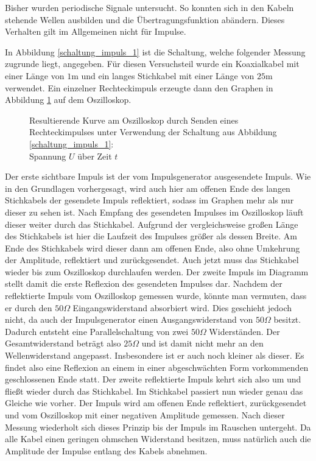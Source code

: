 		Bisher wurden periodische Signale untersucht.
		So konnten sich in den Kabeln stehende Wellen ausbilden und die Übertragungsfunktion abändern.
		Dieses Verhalten gilt im Allgemeinen nicht für Impulse.

		In Abbildung \ref{schaltung_impuls_1} ist die Schaltung, welche folgender Messung zugrunde liegt, angegeben.
		Für diesen Versuchsteil wurde ein Koaxialkabel mit einer Länge von $1$m und ein langes Stichkabel mit einer Länge von $25$m verwendet.
		Ein einzelner Rechteckimpuls erzeugte dann den Graphen in Abbildung \ref{diagramm_impuls_1} auf dem Oszilloskop.

		\begin{figure}[H]
			\center
			
			\caption{\centering Resultierende Kurve am Oszilloskop durch Senden eines Rechteckimpulses unter Verwendung der Schaltung aus Abbildung \ref{schaltung_impuls_1}: \\ Spannung $U$ über Zeit $t$}
			\label{diagramm_impuls_1}
		\end{figure}

		Der erste sichtbare Impuls ist der vom Impulsgenerator ausgesendete Impuls.
		Wie in den Grundlagen vorhergesagt, wird auch hier am offenen Ende des langen Stichkabels der gesendete Impuls reflektiert, sodass im Graphen mehr als nur dieser zu sehen ist.
		Nach Empfang des gesendeten Impulses im Oszilloskop läuft dieser weiter durch das Stichkabel.
		Aufgrund der vergleichsweise großen Länge des Stichkabels ist hier die Laufzeit des Impulses größer als dessen Breite.
		Am Ende des Stichkabels wird dieser dann am offenen Ende, also ohne Umkehrung der Amplitude, reflektiert und zurückgesendet.
		Auch jetzt muss das Stichkabel wieder bis zum Oszilloskop durchlaufen werden.
		Der zweite Impuls im Diagramm stellt damit die erste Reflexion des gesendeten Impulses dar.
		Nachdem der reflektierte Impuls vom Oszilloskop gemessen wurde, könnte man vermuten, dass er durch den $50\Omega$ Eingangswiderstand absorbiert wird.
		Dies geschieht jedoch nicht, da auch der Impulsgenerator einen Ausgangswiderstand von $50\Omega$ besitzt.
		Dadurch entsteht eine Parallelschaltung von zwei $50\Omega$ Widerständen.
		Der Gesamtwiderstand beträgt also $25\Omega$ und ist damit nicht mehr an den Wellenwiderstand angepasst.
		Insbesondere ist er auch noch kleiner als dieser.
		Es findet also eine Reflexion an einem in einer abgeschwächten Form vorkommenden geschlossenen Ende statt.
		Der zweite reflektierte Impuls kehrt sich also um und fließt wieder durch das Stichkabel.
		Im Stichkabel passiert nun wieder genau das Gleiche wie vorher.
		Der Impuls wird am offenen Ende reflektiert, zurückgesendet und vom Oszilloskop mit einer negativen Amplitude gemessen.
		Nach dieser Messung wiederholt sich dieses Prinzip bis der Impuls im Rauschen untergeht. 
		Da alle Kabel einen geringen ohmschen Widerstand besitzen, muss natürlich auch die Amplitude der Impulse entlang des Kabels abnehmen.

